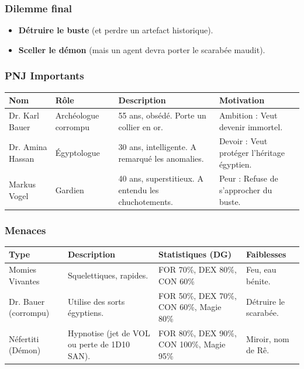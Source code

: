 \documentclass[10pt,a5paper,twoside]{book}
\begin{document}
\subsubsection*{Dilemme final}
\begin{itemize}
	\item \textbf{Détruire le buste} (et perdre un artefact historique).
	\item \textbf{Sceller le démon} (mais un agent devra porter le scarabée maudit).
\end{itemize}

\newpage

\subsubsection*{PNJ Importants}
\begin{center}
	\begin{tabular}{|P{2cm}|P{3cm}|P{3.5cm}|P{2.5cm}|}
	\hline
	\textbf{Nom} 		& \textbf{Rôle} 		& \textbf{Description} 									& \textbf{Motivation} \\ \hline
	Dr. Karl Bauer 		& Archéologue corrompu 	& 55 ans, obsédé. Porte un collier en or. 				& Ambition : Veut devenir immortel. \\ \hline
	Dr. Amina Hassan 	& Égyptologue 			& 30 ans, intelligente. A remarqué les anomalies. 		& Devoir : Veut protéger l'héritage égyptien. \\ \hline
	Markus Vogel 		& Gardien 				& 40 ans, superstitieux. A entendu les chuchotements. 	& Peur : Refuse de s'approcher du buste. \\ \hline
	\end{tabular}
\end{center}

\subsubsection*{Menaces}
\begin{center}
	\begin{tabular}{|P{2cm}|P{3cm}|P{3.5cm}|P{2.5cm}|}
	\hline
	\textbf{Type} 			& \textbf{Description} 							& \textbf{Statistiques (DG)} 					& \textbf{Faiblesses} \\ \hline
	Momies Vivantes 		& Squelettiques, rapides. 						& FOR 70\%, DEX 80\%, CON 60\% 					& Feu, eau bénite. \\ \hline
	Dr. Bauer (corrompu) 	& Utilise des sorts égyptiens. 					& FOR 50\%, DEX 70\%, CON 60\%, Magie 80\% 		& Détruire le scarabée. \\ \hline
	Néfertiti (Démon) 		& Hypnotise (jet de VOL ou perte de 1D10 SAN). 	& FOR 80\%, DEX 90\%, CON 100\%, Magie 95\% 	& Miroir, nom de Rê. \\ \hline
	\end{tabular}
\end{center}
\end{document}
